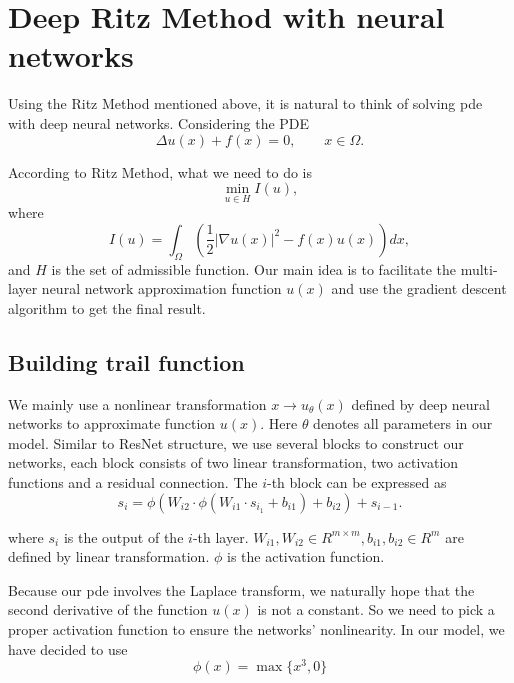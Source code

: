 \documentclass{article}
\begin{document}
\section{Deep Ritz Method with neural networks} %
\par Using the Ritz Method mentioned above, it is natural to think of solving pde with deep neural networks. Considering the PDE
\begin{equation}
\Delta u(x)+f(x)=0,\qquad x\in \Omega.
\end {equation}
\par According to Ritz Method, what we need to do is
\begin{equation}
\min\limits_{u\in H}{I(u)},
\end{equation}
where
\begin{equation}\label{I_equ}
I(u)=\int_\Omega\left(\frac{1}{2}|\nabla u(x)|^2-f(x)u(x)\right)dx,
\end{equation}
and $H$ is the set of admissible function. Our main idea is to facilitate the multi-layer neural network approximation function $u(x)$ and use the gradient descent algorithm to get the final result.\\

\subsection{Building trail function}
\par We mainly use a nonlinear transformation $x \to u_{\theta}(x)$ defined by deep neural networks to approximate function $u(x)$. Here $\theta$ denotes all parameters in our model. Similar to ResNet structure, we use several blocks to construct our networks, each block consists of two linear transformation, two activation functions and a residual connection. The $i$-th block can be expressed as 
\begin{equation}
s_i=\phi(W_{i2}\cdot\phi(W_{i1}\cdot s_{i_1}+b_{i1})+b_{i2})+s_{i-1}.\label{res_equ}
\end{equation}

where $s_{i}$ is the output of the $i$-th layer. $W_{i1},W_{i2}\in R^{m\times m},b_{i1},b_{i2}\in R^{m}$ are defined by linear transformation. $\phi$ is the activation function.



\par Because our pde involves the Laplace transform, we naturally hope that the second derivative of the function $u(x)$ is not a constant. So we need to pick a proper activation function to ensure the networks' nonlinearity. In our model, we have decided to use 
\begin{equation}
\phi(x)=\max\{x^3,0\} 
\end{equation}
\end{document}
